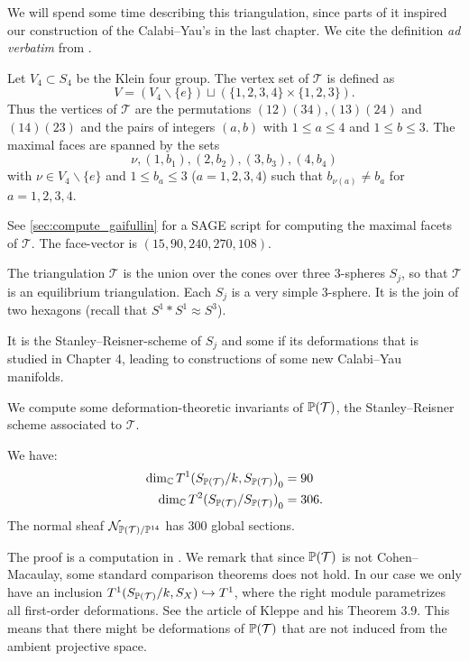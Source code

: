  We will spend some time describing this triangulation, since parts of it inspired our construction of the Calabi--Yau's in the last chapter. We cite the definition \emph{ad verbatim} from \cite{cp2_15_chess}. 

 \begin{definition}
 Let $V_4 \subset S_4$ be the Klein four group. The vertex set of $\mathcal T$ is defined as
\[
 V = (V_4 \backslash \{e \}) \sqcup \left( \{1,2,3,4 \} \times \{ 1,2,3 \} \right).
\]
 Thus the vertices of $\mathcal T$ are the permutations $(12)(34)$,$(13)(24)$ and $(14)(23)$ and the pairs of integers $(a,b)$ with $1 \leq a \leq 4$ and $1 \leq b \leq 3$. The maximal faces are spanned by the sets 
\[
 \nu, (1,b_1), (2,b_2), (3,b_3), (4,b_4)
\]
 with $\nu \in V_4 \backslash \{ e \}$ and $1 \leq b_a \leq 3$ ($a=1,2,3,4$) such that $b_{\nu(a)} \neq b_a$ for $a=1,2,3,4$.
 \end{definition}

See \cref{sec:compute_gaifullin} for a SAGE \cite{sagemath} script for computing the maximal facets of $\mathcal T$. The face-vector is $(15,90,240,270,108)$.

The triangulation $\mathcal T$ is the union over the cones over three $3$-spheres $S_j$, so that $\mathcal T$ is an equilibrium triangulation. Each $S_j$ is a very simple $3$-sphere. It is the join of two hexagons (recall that $S^1 \ast S^1 \approx S^3$).

\begin{remark}
  It is the Stanley--Reisner-scheme of $S_j$ and some if its
  deformations that is studied in Chapter 4, leading to constructions
  of some new Calabi--Yau manifolds.
\end{remark}

We compute some deformation-theoretic invariants of $\P(\mathcal T)$, the Stanley--Reisner scheme associated to $\mathcal T$.

\begin{proposition}
We have: 
  \begin{eqnarray*}
    \label{eq:t1dims_triang}
\dim_\C  {T^1(S_{\P(\mathcal T)}/k, S_{\P(\mathcal T)})}_0&= 90 \\ 
\dim_\C {T^2(S_{\P(\mathcal T)}/S_{\P(\mathcal T)})}_0 &= 306.
  \end{eqnarray*}
The normal sheaf $\mathcal N_{\P(\mathcal T)/\P^{14}}$ has $300$ global sections.
\end{proposition}

The proof is a computation in \MM. We remark that since $\P(\mathcal T)$ is not Cohen--Macaulay, some standard comparison theorems does not hold. In our case we only have an inclusion $T^1(S_{\P(\mathcal T)}/k,S_X) \hookrightarrow T^1$, where the right module parametrizes all first-order deformations. See the article of Kleppe \cite{kleppe_deformations} and his Theorem 3.9. This means that there might be deformations of $\P(\mathcal T)$ that are not induced from the ambient projective space.

